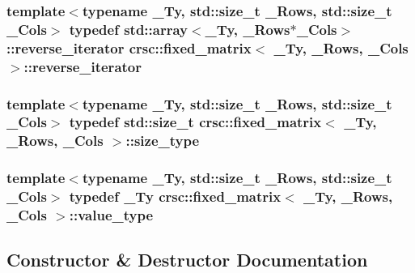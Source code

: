 \subsubsection[{\texorpdfstring{reverse\+\_\+iterator}{reverse_iterator}}]{\setlength{\rightskip}{0pt plus 5cm}template$<$typename \+\_\+\+Ty, std\+::size\+\_\+t \+\_\+\+Rows, std\+::size\+\_\+t \+\_\+\+Cols$>$ typedef std\+::array$<$\+\_\+\+Ty, \+\_\+\+Rows$\ast$\+\_\+\+Cols$>$\+::{\bf reverse\+\_\+iterator} {\bf crsc\+::fixed\+\_\+matrix}$<$ \+\_\+\+Ty, \+\_\+\+Rows, \+\_\+\+Cols $>$\+::{\bf reverse\+\_\+iterator}}\hypertarget{classcrsc_1_1fixed__matrix_ae5db33c8d1ed0872563bfb00c602b33f}{}\label{classcrsc_1_1fixed__matrix_ae5db33c8d1ed0872563bfb00c602b33f}
\subsubsection[{\texorpdfstring{size\+\_\+type}{size_type}}]{\setlength{\rightskip}{0pt plus 5cm}template$<$typename \+\_\+\+Ty, std\+::size\+\_\+t \+\_\+\+Rows, std\+::size\+\_\+t \+\_\+\+Cols$>$ typedef std\+::size\+\_\+t {\bf crsc\+::fixed\+\_\+matrix}$<$ \+\_\+\+Ty, \+\_\+\+Rows, \+\_\+\+Cols $>$\+::{\bf size\+\_\+type}}\hypertarget{classcrsc_1_1fixed__matrix_a4f4ba9cbd0e0723193df4c8281ddd99b}{}\label{classcrsc_1_1fixed__matrix_a4f4ba9cbd0e0723193df4c8281ddd99b}
\subsubsection[{\texorpdfstring{value\+\_\+type}{value_type}}]{\setlength{\rightskip}{0pt plus 5cm}template$<$typename \+\_\+\+Ty, std\+::size\+\_\+t \+\_\+\+Rows, std\+::size\+\_\+t \+\_\+\+Cols$>$ typedef \+\_\+\+Ty {\bf crsc\+::fixed\+\_\+matrix}$<$ \+\_\+\+Ty, \+\_\+\+Rows, \+\_\+\+Cols $>$\+::{\bf value\+\_\+type}}\hypertarget{classcrsc_1_1fixed__matrix_a1d0717197dc43f3752d508763a8b5a9e}{}\label{classcrsc_1_1fixed__matrix_a1d0717197dc43f3752d508763a8b5a9e}


\subsection{Constructor \& Destructor Documentation}
